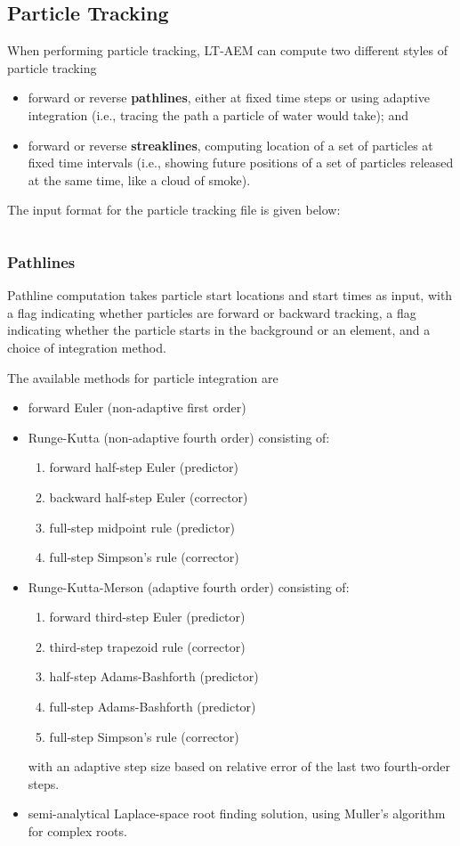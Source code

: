 \documentclass[12pt,letterpaper]{article}
\begin{document}
\subsection{Particle Tracking}
When performing particle tracking, LT-AEM can compute two different
styles of particle tracking
\begin{itemize}
\item forward or reverse \textbf{pathlines}, either at fixed time steps or
  using adaptive integration (i.e., tracing the path a particle of
  water would take); and
\item forward or reverse \textbf{streaklines}, computing location of a set of
  particles at fixed time intervals (i.e., showing future positions of
  a set of particles released at the same time, like a cloud of
  smoke).
\end{itemize}

The input format for the particle tracking file is given below:
\begin{verbatim}

\end{verbatim}

\subsubsection{Pathlines}
Pathline computation takes particle start locations and start times as
input, with a flag indicating whether particles are forward or
backward tracking, a flag indicating whether the particle starts in
the background or an element, and a choice of integration method.

The available methods for particle integration are
\begin{itemize}
\item forward Euler (non-adaptive first order)
\item Runge-Kutta (non-adaptive fourth order) consisting of:
  \begin{enumerate}
  \item forward half-step Euler (predictor)
  \item backward half-step Euler (corrector)
  \item full-step midpoint rule (predictor)
  \item full-step Simpson's rule (corrector)
  \end{enumerate}
\item Runge-Kutta-Merson (adaptive fourth order) consisting of:
  \begin{enumerate}
  \item forward third-step Euler (predictor)
  \item third-step trapezoid rule (corrector)
  \item half-step Adams-Bashforth (predictor)
  \item full-step Adams-Bashforth (predictor)
  \item full-step Simpson's rule (corrector)
  \end{enumerate}
  with an adaptive step size based on relative error of the last two
  fourth-order steps.
\item semi-analytical Laplace-space root finding solution, using
  Muller's algorithm for complex roots.
\end{itemize}
\end{document}
